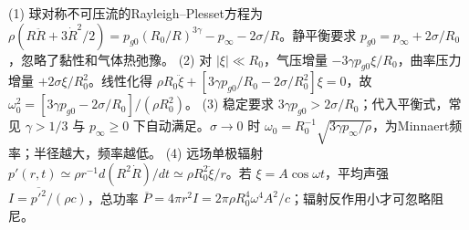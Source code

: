 (1) 球对称不可压流的Rayleigh--Plesset方程为 \(\rho(R\ddot R+3\dot R^2/2)=p_{g0}(R_0/R)^{3\gamma}-p_\infty-2\sigma/R\)。静平衡要求 \(p_{g0}=p_\infty+2\sigma/R_0\)，忽略了黏性和气体热弛豫。
(2) 对 \(|\xi|\ll R_0\)，气压增量 \(-3\gamma p_{g0}\xi/R_0\)，曲率压力增量 \(+2\sigma\xi/R_0^2\)。线性化得 \(\rho R_0\ddot\xi+[3\gamma p_{g0}/R_0-2\sigma/R_0^2]\xi=0\)，故 \(\omega_0^2=[3\gamma p_{g0}-2\sigma/R_0]/(\rho R_0^2)\)。
(3) 稳定要求 \(3\gamma p_{g0}>2\sigma/R_0\)；代入平衡式，常见 \(\gamma>1/3\) 与 \(p_\infty\ge0\) 下自动满足。\(\sigma\to0\) 时 \(\omega_0=R_0^{-1}\sqrt{3\gamma p_\infty/\rho}\)，为Minnaert频率；半径越大，频率越低。
(4) 远场单极辐射 \(p'(r,t)\simeq\rho r^{-1}d(R^2\dot R)/dt\simeq\rho R_0^2\ddot\xi/r\)。若 \(\xi=A\cos\omega t\)，平均声强 \(I=\overline{p'^2}/(\rho c)\)，总功率 \(\overline P=4\pi r^2I=2\pi\rho R_0^4\omega^4A^2/c\)；辐射反作用小才可忽略阻尼。
